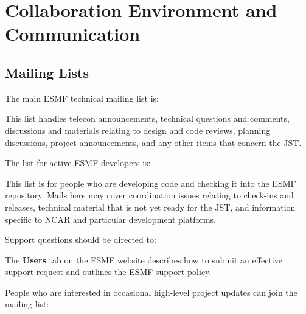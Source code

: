 
\section{Collaboration Environment and Communication}

\subsection{Mailing Lists}

The main ESMF technical mailing list is:
\begin{center}
\end{center}

This list handles telecon announcements, technical questions and
comments, discussions and materials relating to design and code
reviews, planning discussions, project announcements, and any other
items that concern the JST.

The list for active ESMF developers is:
\begin{center}
\end{center}

This list is for people who are developing code and checking
it into the ESMF repository.  Mails here may cover coordination 
issues relating to check-ins and releases, technical material that
is not yet ready for the JST, and information specific to NCAR
and particular development platforms.

Support questions should be directed to:
\begin{center}
\end{center}

The {\bf Users} tab on the ESMF website describes
how to submit an effective support request and outlines the ESMF support
policy.

People who are interested in occasional high-level project updates
can join the mailing list:
\begin{center}
\end{center}

